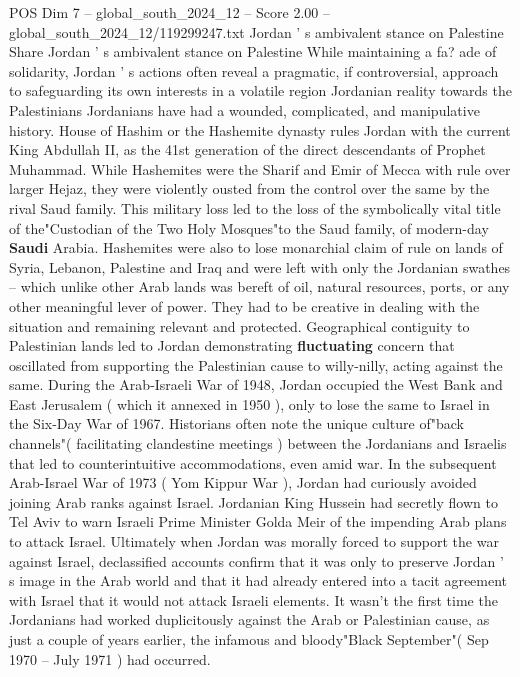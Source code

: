 \begin{textsample}{POS Dim 7 – global\_south\_2024\_12 – Score 2.00 – global\_south\_2024\_12/119299247.txt}  \label{ex:f7_pos_152}
Jordan ' s ambivalent stance on Palestine Share Jordan ' s ambivalent stance on Palestine While maintaining a fa? ade of solidarity, Jordan ' s actions often reveal a pragmatic, if controversial, approach to safeguarding its own interests in a volatile region Jordanian reality towards the Palestinians Jordanians have had a wounded, complicated, and manipulative history.
House of Hashim or the Hashemite dynasty rules Jordan with the current King Abdullah II, as the 41st generation of the direct descendants of Prophet Muhammad.
While Hashemites were the Sharif and Emir of Mecca with rule over larger Hejaz, they were violently ousted from the control over the same by the rival Saud family.
This military loss led to the loss of the symbolically vital title of the"Custodian of the Two Holy Mosques"to the Saud family, of modern-day \textbf{Saudi} Arabia.
Hashemites were also to lose monarchial claim of rule on lands of Syria, Lebanon, Palestine and Iraq and were left with only the Jordanian swathes -- which unlike other Arab lands was bereft of oil, natural resources, ports, or any other meaningful lever of power.
They had to be creative in dealing with the situation and remaining relevant and protected.
Geographical contiguity to Palestinian lands led to Jordan demonstrating \textbf{fluctuating} concern that oscillated from supporting the Palestinian cause to willy-nilly, acting against the same.
During the Arab-Israeli War of 1948, Jordan occupied the West Bank and East Jerusalem ( which it annexed in 1950 ), only to lose the same to Israel in the Six-Day War of 1967.
Historians often note the unique culture of"back channels"( facilitating clandestine meetings ) between the Jordanians and Israelis that led to counterintuitive accommodations, even amid war.
In the subsequent Arab-Israel War of 1973 ( Yom Kippur War ), Jordan had curiously avoided joining Arab ranks against Israel.
Jordanian King Hussein had secretly flown to Tel Aviv to warn Israeli Prime Minister Golda Meir of the impending Arab plans to attack Israel.
Ultimately when Jordan was morally forced to support the war against Israel, declassified accounts confirm that it was only to preserve Jordan ' s image in the Arab world and that it had already entered into a tacit agreement with Israel that it would not attack Israeli elements.
It wasn't the first time the Jordanians had worked duplicitously against the Arab or Palestinian cause, as just a couple of years earlier, the infamous and bloody"Black September"( Sep 1970 -- July 1971 ) had occurred.

\end{textsample}
